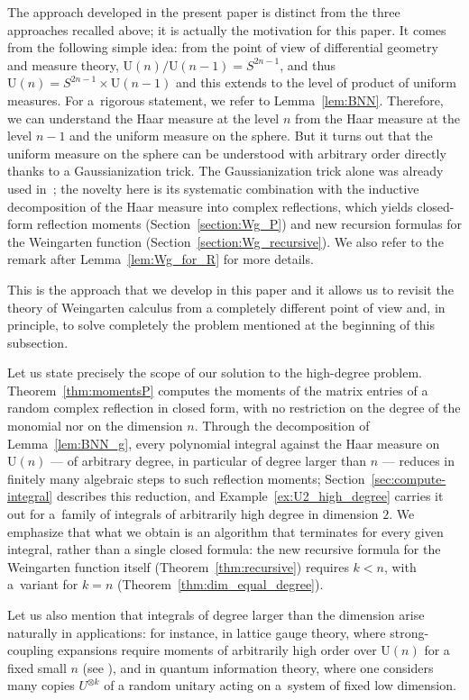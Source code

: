 \documentclass[pdftex]{sigma}
\numberwithin{equation}{section}
\theoremstyle{definition}
\newcommand{\UU}{\mathrm{U}}
\begin{document}
The approach developed in the present paper is distinct from the three approaches recalled above; it is actually the motivation for this paper. It comes from the following simple idea: from the point of view of differential geometry and measure theory,
$\UU(n)/\UU(n-1)=S^{2n-1}$, and thus
 $\UU(n)=S^{2n-1}\times \UU(n-1)$
 and this extends to the level of product of uniform measures.
 For a~rigorous statement, we refer to Lemma~\ref{lem:BNN}.
 Therefore, we can understand the Haar measure at the level $n$ from the Haar measure at the level $n-1$ and the uniform measure on the sphere. But it turns out that the uniform measure on the sphere can be understood with arbitrary order directly thanks to a Gaussianization trick.
 The Gaussianization trick alone was already used in~\cite{BanicaCollins2008}; the novelty here is its systematic combination with the inductive decomposition of the Haar measure into complex reflections, which yields closed-form reflection moments (Section~\ref{section:Wg_P}) and new recursion formulas for the Weingarten function (Section~\ref{section:Wg_recursive}). We also refer to the remark after Lemma~\ref{lem:Wg_for_R} for more details.


 This is the approach that we develop in this paper and it allows us to revisit the theory of Weingarten calculus from a completely different point of view
 and, in principle, to solve completely the problem mentioned at the beginning of this subsection.

Let us state precisely the scope of our solution to the high-degree problem.
Theorem~\ref{thm:momentsP} computes the moments of the matrix entries of a random complex reflection in closed form, with no restriction on the degree of the monomial nor on the dimension $n$.
Through the decomposition of Lemma~\ref{lem:BNN_g}, every polynomial integral against the Haar measure on $\UU(n)$ --- of arbitrary degree, in particular of degree larger than $n$ --- reduces in finitely many algebraic steps to such reflection moments; Section~\ref{sec:compute-integral} describes this reduction, and Example~\ref{ex:U2_high_degree} carries it out for a~family of integrals of arbitrarily high degree in dimension $2$.
We emphasize that what we obtain is an algorithm that terminates for every given integral, rather than a single closed formula: the new recursive formula for the Weingarten function itself (Theorem~\ref{thm:recursive}) requires $k<n$, with a~variant for $k=n$ (Theorem~\ref{thm:dim_equal_degree}).

Let us also mention that integrals of degree larger than the dimension arise naturally in applications: for instance, in lattice gauge theory, where strong-coupling expansions require moments of arbitrarily high order over $\UU(n)$ for a fixed small $n$ (see \cite{MR597583}), and in quantum information theory, where one considers many copies $U^{\otimes k}$ of a random unitary acting on a~system of fixed low dimension.
\end{document}
